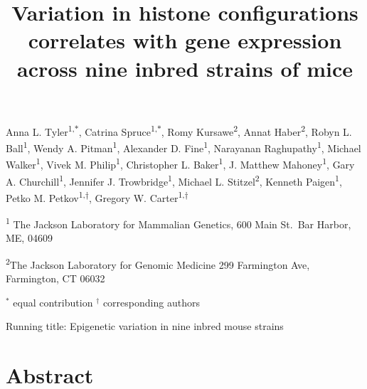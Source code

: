\documentclass[
  11pt,
]{article}
\title{Variation in histone configurations correlates with gene
expression across nine inbred strains of mice}
\author{}
\date{\vspace{-2.5em}}
\begin{document}
\maketitle

Anna L. Tyler\textsuperscript{1,$*$}, Catrina
Spruce\textsuperscript{1,$*$}, Romy Kursawe\textsuperscript{2}, Annat
Haber\textsuperscript{2}, Robyn L. Ball\textsuperscript{1}, Wendy A.
Pitman\textsuperscript{1}, Alexander D. Fine\textsuperscript{1},
Narayanan Raghupathy\textsuperscript{1}, Michael
Walker\textsuperscript{1}, Vivek M. Philip\textsuperscript{1},
Christopher L. Baker\textsuperscript{1}, J. Matthew
Mahoney\textsuperscript{1}, Gary A. Churchill\textsuperscript{1},
Jennifer J. Trowbridge\textsuperscript{1}, Michael L.
Stitzel\textsuperscript{2}, Kenneth Paigen\textsuperscript{1}, Petko M.
Petkov\textsuperscript{1,$\dagger$}, Gregory W.
Carter\textsuperscript{1,$\dagger$}

\textsuperscript{1} The Jackson Laboratory for Mammalian Genetics, 600
Main St.~Bar Harbor, ME, 04609

\textsuperscript{2}The Jackson Laboratory for Genomic Medicine 299
Farmington Ave, Farmington, CT 06032

\(^*\) equal contribution \(^\dagger\) corresponding authors

Running title: Epigenetic variation in nine inbred mouse strains

\pagebreak

\hypertarget{abstract}{%
\section{Abstract}\label{abstract}}
\end{document}
